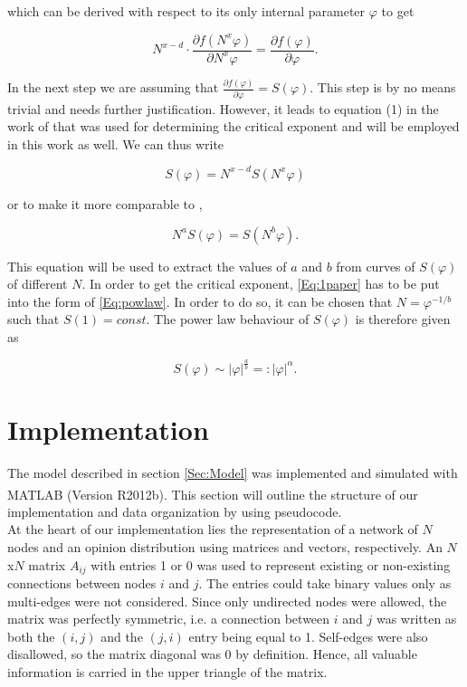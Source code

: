 \documentclass[11pt]{article}
\begin{document}
which can be derived with respect to its only internal parameter $\varphi$ to get

\begin{equation}
N^{x-d} \cdot \frac{\partial f(N^x \varphi)}{\partial N^x \varphi} = \frac{\partial f(\varphi)}{\partial \varphi}.
\end{equation}

In the next step we are assuming that $\frac{\partial f(\varphi)}{\partial \varphi} = S(\varphi)$. This step is by no means trivial and needs further justification. However, it leads to equation (1) in the work of \cite{main paper} that was used for determining the critical exponent and will be employed in this work as well. We can thus write

\begin{equation}
S(\varphi) = N^{x-d} S(N^x\varphi)
\end{equation}

or to make it more comparable to \cite{main paper},

\begin{equation}\label{Eq:1paper}
N^{a} S(\varphi) = S(N^b\varphi).
\end{equation}

This equation will be used to extract the values of $a$ and $b$ from curves of $S(\varphi)$ of different $N$. In order to get the critical exponent, \eqref{Eq:1paper} has to be put into the form of \eqref{Eq:powlaw}. In order to do so, it can be chosen that $N = \varphi^{-1/b}$ such that $S(1)=const.$ The power law behaviour of $S(\varphi)$ is therefore given as

\begin{equation}
\label{Eq:ab-powlaw}
S(\varphi) \sim |\varphi|^{\frac{a}{b}} =: |\varphi|^\alpha.
\end{equation}



\section{Implementation}

The model described in section \ref{Sec:Model} was implemented and simulated with MATLAB\textsuperscript{\textregistered} (Version R2012b). This section will outline the structure of our implementation and data organization by using pseudocode. \\


At the heart of our implementation lies the representation of a network of $N$ nodes and an opinion distribution using matrices and vectors, respectively. An $N$x$N$ matrix $A_{ij}$ with entries 1 or 0 was used to represent existing or non-existing connections between nodes $i$ and $j$. The entries could take binary values only as multi-edges were not considered. Since only undirected nodes were allowed, the matrix was perfectly symmetric, i.e. a connection between $i$ and $j$ was written as both the $(i,j)$ and the $(j,i)$ entry being equal to 1. Self-edges were also disallowed, so the matrix diagonal was 0 by definition. Hence, all valuable information is carried in the upper triangle of the matrix. 
\end{document}

